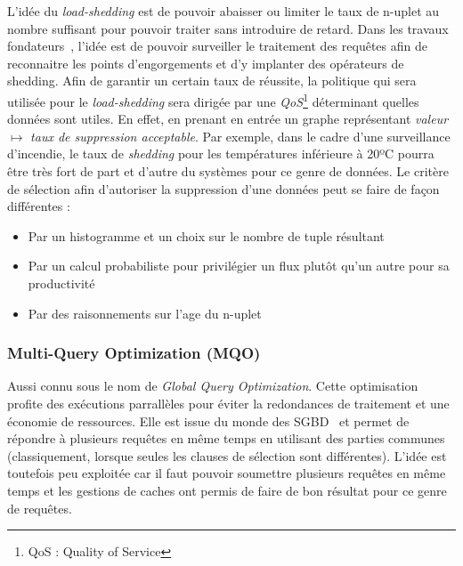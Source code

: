 L'idée du \textit{load-shedding} est de pouvoir abaisser ou limiter le taux de n-uplet au nombre suffisant pour pouvoir traiter sans introduire de retard. Dans les travaux fondateurs~\cite{Tatbul:window,Tatbul:load-shedding}, l'idée est de pouvoir surveiller le traitement des requêtes afin de reconnaitre les points d'engorgements et d'y implanter des opérateurs de shedding. Afin de garantir un certain taux de réussite, la politique qui sera utilisée pour le \textit{load-shedding} sera dirigée par une \textit{QoS}\footnote{QoS : Quality of Service} déterminant quelles données sont utiles. En effet, en prenant en entrée un graphe représentant \textit{valeur} $\mapsto$  \textit{taux de suppression acceptable}. Par exemple, dans le cadre d'une surveillance d'incendie, le taux de \textit{shedding} pour les températures inférieure à 20ºC pourra être très fort de part et d'autre du systèmes pour ce genre de données. Le critère de sélection afin d'autoriser la suppression d'une données peut se faire de façon différentes :
\begin{itemize}
 \item Par un histogramme et un choix sur le nombre de tuple résultant~\cite{Han:join}
 \item Par un calcul probabiliste pour privilégier un flux plutôt qu'un autre pour sa productivité~\cite{Han:join}
 \item Par des raisonnements sur l'age du n-uplet~\cite{Srivastava:join}
\end{itemize}


\subsubsection{Multi-Query Optimization (MQO)}
Aussi connu sous le nom de \textit{Global Query Optimization}. Cette optimisation profite des exécutions parrallèles pour éviter la redondances de traitement et une économie de ressources. Elle est issue du monde des SGBD~\cite{Sellis:mqo} et permet de répondre à plusieurs requêtes en même temps en utilisant des parties communes (classiquement, lorsque seules les clauses de sélection sont différentes). L'idée est toutefois peu exploitée car il faut pouvoir soumettre plusieurs requêtes en même temps et les gestions de caches ont permis de faire de bon résultat pour ce genre de requêtes. 

